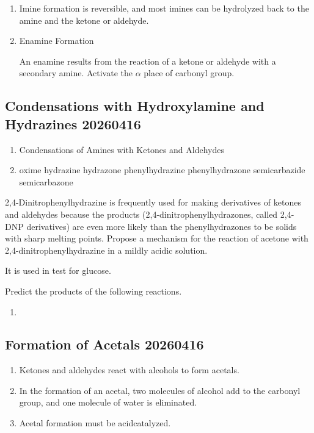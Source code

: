 \begin{enumerate}[resume]
    \item Imine formation is reversible, and most imines can be hydrolyzed back to the amine and the ketone or aldehyde. %
    \item Enamine Formation %
    
    An enamine results from the reaction of a ketone or aldehyde with a secondary amine. Activate the $\alpha$ place of carbonyl group.
\end{enumerate}

\subsection{Condensations with Hydroxylamine and Hydrazines 20260416}

\begin{enumerate}
    \item Condensations of Amines with Ketones and Aldehydes %
    \item oxime %
    hydrazine %
    hydrazone %
    phenylhydrazine %
    phenylhydrazone %
    semicarbazide %
    semicarbazone %
\end{enumerate}

\begin{example} %
    2,4-Dinitrophenylhydrazine is frequently used for making derivatives of ketones and aldehydes because the products (2,4-dinitrophenylhydrazones, called 2,4-DNP derivatives) are even more likely than the phenylhydrazones to be solids with sharp melting points. Propose a mechanism for the reaction of acetone with 2,4-dinitrophenylhydrazine in a mildly acidic solution. 
    
    It is used in test for glucose. %
\end{example}

\begin{example}
    Predict the products of the following reactions.
    \begin{enumerate}[label=(\alph*)]
        \item
    \end{enumerate}
\end{example}

\subsection{Formation of Acetals 20260416}

\begin{enumerate}
    \item Ketones and aldehydes react with alcohols to form acetals.
    \item In the formation of an acetal, two molecules of alcohol add to the carbonyl group, and one molecule of water is eliminated.
    \item Acetal formation must be acidcatalyzed.
\end{enumerate}

